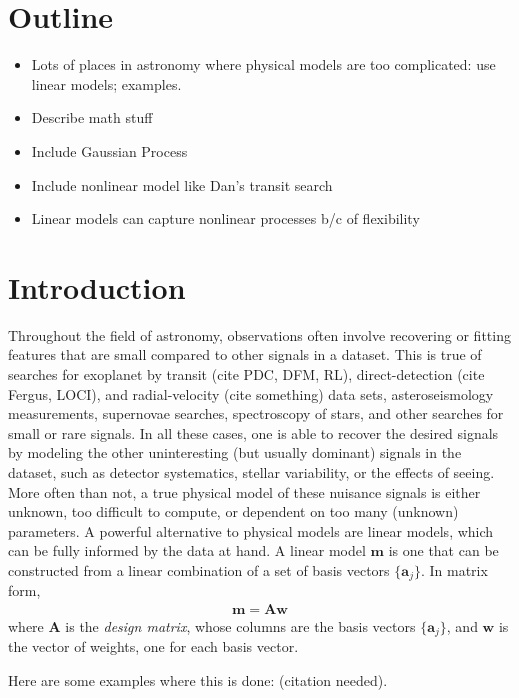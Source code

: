 \documentclass[modern]{rnaastex}
\newcommand{\bvec}[1]{{\ensuremath{\boldsymbol{#1}}}}
\newcommand{\citeme}{{\color{red}(citation needed)}}
\begin{document}
\section{Outline}

\begin{itemize}
\item Lots of places in astronomy where physical models are too complicated: 
      use linear models; examples.
\item Describe math stuff
\item Include Gaussian Process
\item Include nonlinear model like Dan's transit search
\item Linear models can capture nonlinear processes b/c of flexibility
\end{itemize}

\section{Introduction}

Throughout the field of astronomy, observations often involve recovering or 
fitting features that are small compared to other signals in a dataset. 
This is true of searches for exoplanet by transit (cite PDC, DFM, RL), 
direct-detection (cite Fergus, LOCI), and radial-velocity  (cite something) 
data sets, asteroseismology measurements, supernovae searches, spectroscopy 
of stars, and other searches for small or rare signals. In all these cases, 
one is able to recover the desired signals by modeling the other uninteresting 
(but usually dominant) signals in the dataset, such as detector systematics, 
stellar variability, or the effects of seeing. 
More often than not, a true physical model of these nuisance signals is either 
unknown, too difficult to compute, or dependent on too many (unknown) 
parameters. A powerful alternative to physical models are linear models, which 
can be fully informed by the data at hand. A linear model $\bvec{m}$ is one 
that can be constructed from a linear combination of a set of basis vectors 
$\{\bvec{a}_j\}$. In matrix form,
%
\begin{align}
\bvec{m} = \bvec{A} \bvec{w}
\end{align}
%
where $\bvec{A}$ is the \emph{design matrix}, whose columns are the basis 
vectors $\{\bvec{a}_j\}$, and $\bvec{w}$ is the vector of weights, one 
for each basis vector.

Here are some examples where this is done: \citeme. 
\citep{Luger:2017,Luger:2016}
\end{document}
